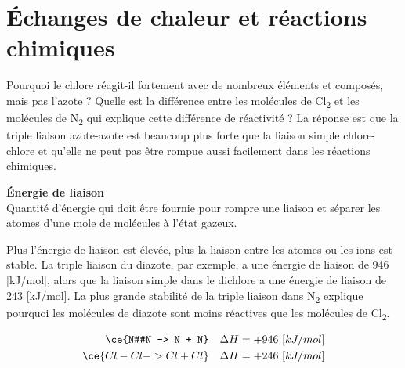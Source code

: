 \documentclass[
  11pt,
  a4paper,
  openany]{book}
\begin{document}
\section{Échanges de chaleur et réactions chimiques}\label{uxe9changes-de-chaleur-et-ruxe9actions-chimiques}

Pourquoi le chlore réagit-il fortement avec de nombreux éléments et composés, mais pas l'azote ? Quelle est la différence entre les molécules de Cl\textsubscript{2} et les molécules de N\textsubscript{2} qui explique cette différence de réactivité ? La réponse est que la triple liaison azote-azote est beaucoup plus forte que la liaison simple chlore-chlore et qu'elle ne peut pas être rompue aussi facilement dans les réactions chimiques.

\begin{tcolorbox}
\textbf{Énergie de liaison}\\
Quantité d'énergie qui doit être fournie pour rompre une liaison et séparer les atomes d'une mole de molécules à l'état gazeux.

\end{tcolorbox}

Plus l'énergie de liaison est élevée, plus la liaison entre les atomes ou les ions est stable. La triple liaison du diazote, par exemple, a une énergie de liaison de 946 {[}kJ/mol{]}, alors que la liaison simple dans le dichlore a une énergie de liaison de 243 {[}kJ/mol{]}. La plus grande stabilité de la triple liaison dans N\textsubscript{2} explique pourquoi les molécules de diazote sont moins réactives que les molécules de Cl\textsubscript{2}.

\[
\begin{split}
\ce{N#N -> N + N} \quad \Delta H = +946\ [kJ/mol] \\ 
\ce{Cl-Cl -> Cl + Cl} \quad \Delta H = +246\ [kJ/mol]
\end{split}
\]
\end{document}
